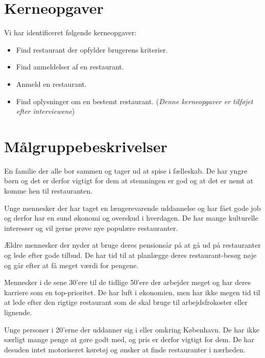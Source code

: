 \documentclass[a4paper, 12pt]{article}
\begin{document}
\section{Kerneopgaver}

Vi har identificeret følgende kerneopgaver:
\begin{itemize}
\item Find restaurant der opfylder brugerens kriterier.
\item Find anmeldelser af en restaurant.
\item Anmeld en restaurant.
\item Find oplysninger om en bestemt restaurant. {\small (\emph{Denne kerneopgaver er tilføjet efter interviewene})}
\end{itemize}

\section{Målgruppebeskrivelser}
\label{sec:Maalgruppebeskrivelser}

\begin{description}[style=nextline,font=\bf]
  \item[Familier med små børn]

    En familie der alle bor sammen og tager ud at spise i
    fælleskab. De har yngre børn og det er derfor vigtigt for dem at
    stemningen er god og at det er nemt at komme hen til restauranten.

  \item[25--30 årige storby-par uden børn]

    Unge mennesker der har taget en længerevarende uddannelse og har
    fået gode job og derfor har en sund økonomi og overskud i
    hverdagen. De har mange kulturelle interesser og vil gerne prøve
    nye populære restauranter.

  \item[Pensionister]

    Ældre mennesker der nyder at bruge deres pensionsår på at gå ud på
    restauranter og lede efter gode tilbud. De har tid til at
    planlægge deres restaurant-besøg nøje og går efter at få meget
    værdi for pengene.

  \item[Karrieremennesker]

    Mennesker i de sene 30'ere til de tidlige 50'ere der arbejder
    meget og har deres karriere som en top-prioritet. De har luft i
    økonomien, men har ikke megen tid til at lede efter den rigtige
    restaurant som de skal bruge til arbejdsfrokoster eller lignende.

  \item[Studerende]

    Unge personer i 20'erne der uddanner sig i eller omkring
    København. De har ikke særligt mange penge at gøre godt med, og
    pris er derfor vigtigt for dem. De har desuden intet motoriseret
    køretøj og ønsker at finde restauranter i nærheden.
\end{description}
\end{document}
